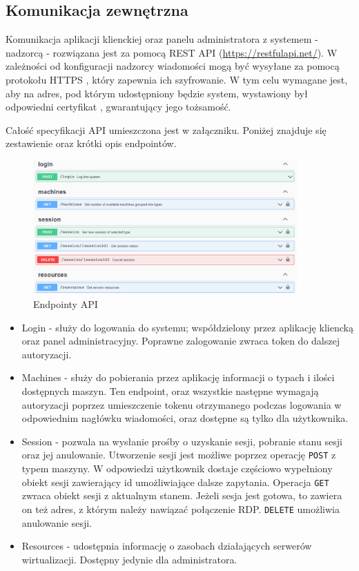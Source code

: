 \documentclass[../opis-rozwiazania.tex]{subfiles}
\begin{document}
\subsection{Komunikacja zewnętrzna}
\label{communication:api}
Komunikacja aplikacji klienckiej oraz panelu administratora z systemem - nadzorcą - rozwiązana jest za pomocą REST API (\url{https://restfulapi.net/}). W zależności od konfiguracji nadzorcy wiadomości mogą być wysyłane za pomocą protokołu HTTPS \parencite{rfc2818}, który zapewnia ich szyfrowanie. W tym celu wymagane jest, aby na adres, pod którym udostępniony będzie system, wystawiony był odpowiedni certyfikat \parencite{ssl-cert}, gwarantujący jego tożsamość.

Całość specyfikacji API umieszczona jest w załączniku. Poniżej znajduje się zestawienie oraz krótki opis endpointów.

\begin{figure}[H]
  \centering
  \includegraphics[width=0.9\textwidth]{../api/endpoints.png}
  \caption{Endpointy API}
\end{figure}

\begin{itemize}
  \item Login - służy do logowania do systemu; współdzielony przez aplikację kliencką oraz panel administracyjny. Poprawne zalogowanie zwraca token do dalszej autoryzacji.
  \item Machines - służy do pobierania przez aplikację informacji o typach i ilości dostępnych maszyn. Ten endpoint, oraz wszystkie następne wymagają autoryzacji poprzez umieszczenie tokenu otrzymanego podczas logowania w odpowiednim nagłówku wiadomości, oraz dostępne są tylko dla użytkownika.
  \item Session - pozwala na wysłanie prośby o uzyskanie sesji, pobranie stanu sesji oraz jej anulowanie. Utworzenie sesji jest możliwe poprzez operację \texttt{POST} z typem maszyny. W odpowiedzi użytkownik dostaje częściowo wypełniony obiekt sesji zawierający id umożliwiające dalsze zapytania. Operacja \texttt{GET} zwraca obiekt sesji z aktualnym stanem. Jeżeli sesja jest gotowa, to zawiera on też adres, z którym należy nawiązać połączenie RDP. \texttt{DELETE} umożliwia anulowanie sesji.
  \item Resources - udostępnia informację o zasobach działających serwerów wirtualizacji. Dostępny jedynie dla administratora.
\end{itemize}
\end{document}
